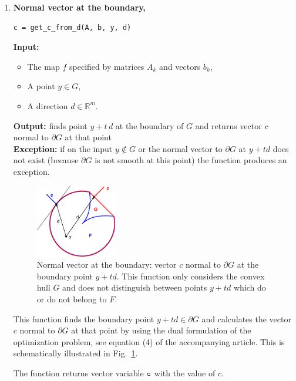 \documentclass[a4paper]{article}
\newcommand{\R}{\mathbb{R}}
\theoremstyle{definition}
\begin{document}
\begin{enumerate}
\newpage

\item {\bf Normal vector at the boundary,\hskip 6pt} 
\begin{verbatim}
c = get_c_from_d(A, b, y, d)
\end{verbatim}
{\bf Input:}
\begin{itemize}
	\item The map $f$ specified by matrices $A_k$ and vectors $b_k$,
	\item A point $y\in G$,
	\item A direction $d\in\R^m$.
\end{itemize}
{\bf Output:}  finds point $y+t\,d$ at the boundary of $G$ and returns vector $c$ normal to $\partial G$ at that point\\
{\bf Exception:} if on the input $y\notin G$ or the normal vector to $\partial G$ at $y+td$ does not exist (because $\partial G$ is not smooth at this point)  the function produces an exception.


\begin{figure}[H]
	\centering\includegraphics[width=100pt]{fig/get_c_from_d}
	\caption{Normal vector at the boundary: vector $c$ normal to $\partial G$ at the boundary point $y+td$. This function only considers the convex hull $G$ and does not distinguish between points $y+td$ which do or do not belong to $F$.}
\label{fig:three}
\end{figure}

This function finds the boundary point $y+td\in \partial G$ and calculates the vector $c$ normal to $\partial G$ at that point by using the dual formulation of the optimization problem, see equation (4) of the accompanying article.
This is schematically illustrated in Fig.~\ref{fig:three}.

The function returns vector variable $\tt c$ with the value of $c$.

\newpage


\end{enumerate}
\end{document}
